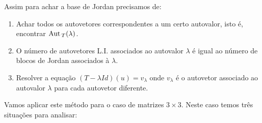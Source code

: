 Assim para achar a base de Jordan precisamos de:
\begin{enumerate}[label={\roman*})]
    \item Achar todos os autovetores correspondentes a um certo autovalor, isto \'e, encontrar ${\rm Aut\,}_T(\lambda)$.
    \item O n\'umero de autovetores L.I. associados ao autovalor $\lambda$ \'e igual ao n\'umero de blocos de Jordan associados \`a $\lambda$.
    \item Resolver a equa\c{c}\~ao $(T - \lambda Id)(u) = v_\lambda$ onde $v_\lambda$ \'e o autovetor associado ao autovalor $\lambda$ para cada autovetor diferente.
\end{enumerate}

Vamos aplicar este m\'etodo para o caso de matrizes $3 \times 3$. Neste caso temos tr\^es situa\c{c}\~oes para analisar:

